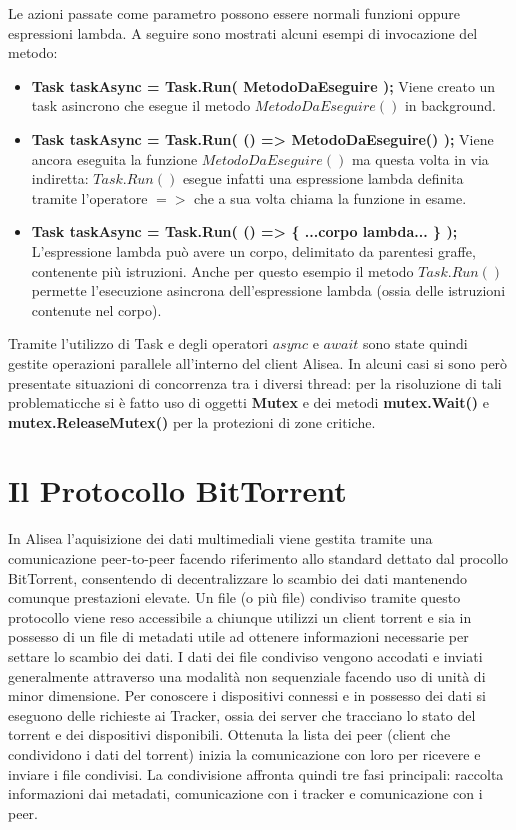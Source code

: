 \documentclass[a4]{book}
\begin{document}
Le azioni passate come parametro possono essere normali funzioni oppure espressioni lambda. A seguire sono mostrati alcuni esempi di invocazione del metodo:
\begin{itemize}
	\item \textbf{Task taskAsync = Task.Run( MetodoDaEseguire );}\newline
	Viene creato un task asincrono che esegue il metodo $MetodoDaEseguire()$ in background.
	\item \textbf{Task taskAsync = Task.Run( () => MetodoDaEseguire() );}\newline
	Viene ancora eseguita la funzione $MetodoDaEseguire()$ ma questa volta in via indiretta: $Task.Run()$ esegue infatti una espressione lambda definita tramite l'operatore $=>$ che a sua volta chiama la funzione in esame.
	\item \textbf{Task taskAsync = Task.Run( () => \{ ...corpo lambda... \} );}\newline
	L'espressione lambda può avere un corpo, delimitato da parentesi graffe, contenente più istruzioni. Anche per questo esempio il metodo $Task.Run()$ permette l'esecuzione asincrona dell'espressione lambda (ossia delle istruzioni contenute nel corpo).
\end{itemize}
Tramite l'utilizzo di Task e degli operatori $async$ e $await$ sono state quindi gestite operazioni parallele all'interno del client Alisea.\newline
In alcuni casi si sono però presentate situazioni di concorrenza tra i diversi thread: per la risoluzione di tali problematicche si è fatto uso di oggetti \textbf{Mutex} e dei metodi \textbf{mutex.Wait()} e \textbf{mutex.ReleaseMutex()} per la protezioni di zone critiche.

\section{Il Protocollo BitTorrent}
In Alisea l'aquisizione dei dati multimediali viene gestita tramite una comunicazione peer-to-peer facendo riferimento allo standard dettato dal procollo BitTorrent, consentendo di decentralizzare lo scambio dei dati mantenendo comunque prestazioni elevate.
Un file (o più file) condiviso tramite questo protocollo viene reso accessibile a chiunque utilizzi un client torrent e sia in possesso di un file di metadati utile ad ottenere informazioni necessarie per settare lo scambio dei dati. I dati dei file condiviso vengono accodati e inviati generalmente attraverso una modalità non sequenziale facendo uso di unità di minor dimensione.\newline
Per conoscere i dispositivi connessi e in possesso dei dati si eseguono delle richieste ai Tracker, ossia dei server che tracciano lo stato del torrent e dei dispositivi disponibili.\newline
Ottenuta la lista dei peer (client che condividono i dati del torrent) inizia la comunicazione con loro per ricevere e inviare i file condivisi.\newline\newline
La condivisione affronta quindi tre fasi principali: raccolta informazioni dai metadati, comunicazione con i tracker e comunicazione con i peer.\newline
\end{document}
